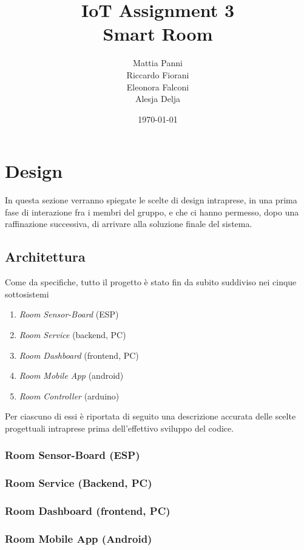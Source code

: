 \documentclass[a4paper,12pt]{report}
\title{%
  IoT Assignment 3 \\
  \large Smart Room}
\author{Mattia Panni \\ Riccardo Fiorani \\ Eleonora Falconi \\ Alesja Delja}
\date{\today}
\begin{document}
\maketitle
\tableofcontents


\chapter{Design}
In questa sezione verranno spiegate le scelte di design intraprese, in una prima fase di interazione fra i membri del gruppo, e che ci hanno permesso, dopo una raffinazione successiva, di arrivare alla soluzione finale del sistema.
\section{Architettura}
Come da specifiche, tutto il progetto è stato fin da subito suddiviso nei cinque sottosistemi 
\begin{enumerate}
    \item \emph{Room Sensor-Board} (ESP)
    \item \emph{Room Service} (backend, PC)
    \item \emph{Room Dashboard} (frontend, PC)
    \item \emph{Room Mobile App} (android)
    \item \emph{Room Controller} (arduino)
\end{enumerate}
Per ciascuno di essi è riportata di seguito una descrizione accurata delle scelte progettuali intraprese prima dell'effettivo sviluppo del codice.

\subsection{Room Sensor-Board (ESP)}
\subsection{Room Service (Backend, PC)}
\subsection{Room Dashboard (frontend, PC)}
\subsection{Room Mobile App (Android)}
\end{document}
